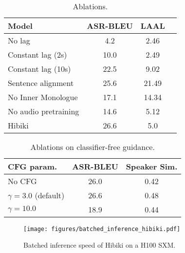 \begin{table}[t]
\caption{Ablations.}
\label{tab:ablation_delay}
\vskip 0.15in
\begin{center}
\begin{scriptsize}
\begin{sc}
\begin{tabular}{lccc}
\toprule
Model & ASR-BLEU & LAAL\\
\midrule
No lag & 4.2 & 2.46 & \\
Constant lag (2s) & 10.0 & 2.49 & \\
Constant lag (10s) & 22.5 & 9.02 & \\
Sentence alignment & 25.6 & 21.49 & \\
\midrule
No Inner Monologue & 17.1 & 14.34 \\
No audio pretraining & 14.6 & 5.12 \\
\midrule
Hibiki & 26.6 & 5.0 & \\
\bottomrule
\end{tabular}
\end{sc}
\end{scriptsize}
\end{center}
\vskip -0.1in
\end{table}

\begin{table}[t]
\caption{Ablations on classifier-free guidance.}
\label{tab:ablation-cfg}
\vskip 0.15in
\begin{center}
\begin{scriptsize}
\begin{sc}
\begin{tabular}{lcc}
\toprule
CFG param. & ASR-BLEU & Speaker Sim.\\
\midrule
No CFG & 26.0 & 0.42 \\
$\gamma = 3.0$ (default) & 26.6 & 0.48 \\
$\gamma = 10.0$ & 18.9 & 0.44 \\
\bottomrule
\end{tabular}
\end{sc}
\end{scriptsize}
\end{center}
\vskip -0.1in
\end{table}

\begin{figure}[t]
    \centering
    \texttt{[image: figures/batched\_inference\_hibiki.pdf]}
    \caption{Batched inference speed of Hibiki on a H100 SXM.}
    \label{fig:batched-inference}
\end{figure}


